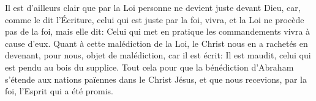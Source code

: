 Il est d’ailleurs clair que par la Loi personne ne devient juste devant Dieu,
	car, comme le dit l’Écriture, celui qui est juste par la foi, vivra,
	et la Loi ne procède pas de la foi, mais elle dit:
	Celui qui met en pratique les commandements vivra à cause d’eux.
Quant à cette malédiction de la Loi, le Christ nous en a rachetés
	en devenant, pour nous, objet de malédiction, car il est écrit:
	Il est maudit, celui qui est pendu au bois du supplice.
Tout cela pour que la bénédiction d’Abraham
		s’étende aux nations païennes dans le Christ Jésus,
	et que nous recevions, par la foi, l’Esprit qui a été promis.
